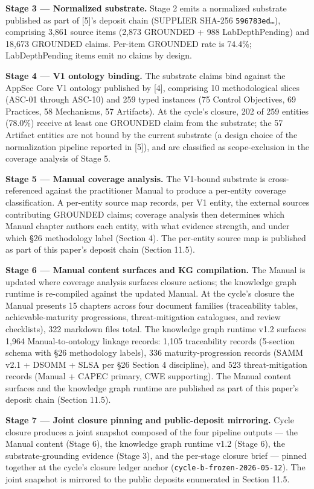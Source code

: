 \documentclass[
]{article}
\begin{document}
\textbf{Stage 3 --- Normalized substrate.} Stage 2 emits a normalized
substrate published as part of {[}5{]}'s deposit chain (SUPPLIER SHA-256
\texttt{596783ed…}), comprising 3,861 source items (2,873 GROUNDED + 988
LabDepthPending) and 18,673 GROUNDED claims. Per-item GROUNDED rate is
74.4\%; LabDepthPending items emit no claims by design.

\textbf{Stage 4 --- V1 ontology binding.} The substrate claims bind
against the AppSec Core V1 ontology published by {[}4{]}, comprising 10
methodological slices (ASC-01 through ASC-10) and 259 typed instances
(75 Control Objectives, 69 Practices, 58 Mechanisms, 57 Artifacts). At
the cycle's closure, 202 of 259 entities (78.0\%) receive at least one
GROUNDED claim from the substrate; the 57 Artifact entities are not
bound by the current substrate (a design choice of the normalization
pipeline reported in {[}5{]}), and are classified as scope-exclusion in
the coverage analysis of Stage 5.

\textbf{Stage 5 --- Manual coverage analysis.} The V1-bound substrate is
cross-referenced against the practitioner Manual to produce a per-entity
coverage classification. A per-entity source map records, per V1 entity,
the external sources contributing GROUNDED claims; coverage analysis
then determines which Manual chapter authors each entity, with what
evidence strength, and under which §26 methodology label (Section 4).
The per-entity source map is published as part of this paper's deposit
chain (Section 11.5).

\textbf{Stage 6 --- Manual content surfaces and KG compilation.} The
Manual is updated where coverage analysis surfaces closure actions; the
knowledge graph runtime is re-compiled against the updated Manual. At
the cycle's closure the Manual presents 15 chapters across four document
families (traceability tables, achievable-maturity progressions,
threat-mitigation catalogues, and review checklists), 322 markdown files
total. The knowledge graph runtime v1.2 surfaces 1,964
Manual-to-ontology linkage records: 1,105 traceability records
(5-section schema with §26 methodology labels), 336 maturity-progression
records (SAMM v2.1 + DSOMM + SLSA per §26 Section 4 discipline), and 523
threat-mitigation records (Manual + CAPEC primary, CWE supporting). The
Manual content surfaces and the knowledge graph runtime are published as
part of this paper's deposit chain (Section 11.5).

\textbf{Stage 7 --- Joint closure pinning and public-deposit mirroring.}
Cycle closure produces a joint snapshot composed of the four pipeline
outputs --- the Manual content (Stage 6), the knowledge graph runtime
v1.2 (Stage 6), the substrate-grounding evidence (Stage 3), and the
per-stage closure brief --- pinned together at the cycle's closure
ledger anchor (\texttt{cycle-b-frozen-2026-05-12}). The joint snapshot
is mirrored to the public deposits enumerated in Section 11.5.
\end{document}
